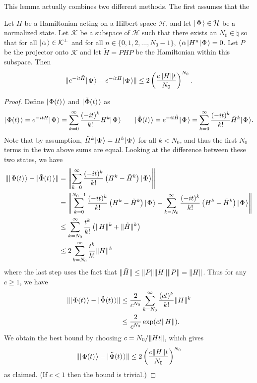 \documentclass[../thesis-main/thesis-main]{subfiles}
\begin{document}
This lemma actually combines two different methods.  The first assumes that the 


\begin{proposition}
\label{pro:trunc_prop}Let $H$ be a Hamiltonian acting on a Hilbert
space $\mathcal{H}$, and let $|\mspace{2mu} \Phi \mspace{2mu} \rangle\in\mathcal{H}$ be a normalized state. Let
$\mathcal{K}$ be a subspace of $\mathcal{H}$ such that there exists an $N_0\in\natural$
so that for all $|\mspace{2mu} \alpha \mspace{2mu} \rangle\in \mathcal{K}^{\perp}$ and for all $n\in\{0,1,2,\ldots, N_0-1\}$, $\langle\mspace{2mu} \alpha \mspace{2mu} |H^{n}|\mspace{2mu} \Phi \mspace{2mu} \rangle=0$.
Let $P$ be the projector onto $\mathcal{K}$ and let $\tilde{H}=PHP$ be
the Hamiltonian within this subspace.  Then
\[
\|{e^{-it\tilde{H}}|\mspace{2mu} \Phi \mspace{2mu} \rangle-e^{-itH}|\mspace{2mu} \Phi \mspace{2mu} \rangle}\| \leq 2\left(\frac{e\|{H}\|t}{N_0}\right)^{N_0}.
\]
\end{proposition}

\begin{proof}
Define $|\mspace{2mu} \Phi(t) \mspace{2mu} \rangle$ and $|\mspace{2mu} \tilde\Phi(t) \mspace{2mu} \rangle$
as
\[
|\mspace{2mu} \Phi(t) \mspace{2mu} \rangle=e^{-itH}|\mspace{2mu} \Phi \mspace{2mu} \rangle=\sum_{k=0}^{\infty}\frac{(-it)^{k}}{k!}H^{k}|\mspace{2mu} \Phi \mspace{2mu} \rangle\qquad|\mspace{2mu} \tilde\Phi(t) \mspace{2mu} \rangle=e^{-it\tilde{H}}|\mspace{2mu} \Phi \mspace{2mu} \rangle=\sum_{k=0}^{\infty}\frac{(-it)^{k}}{k!}\tilde{H}^{k}|\mspace{2mu} \Phi \mspace{2mu} \rangle.
\]
Note that by assumption, $\tilde{H}^{k}|\mspace{2mu} \Phi \mspace{2mu} \rangle=H^{k}|\mspace{2mu} \Phi \mspace{2mu} \rangle$ for all $k< N_0$, and thus the first $N_0$ terms in the two above sums are equal. Looking at the difference between these two states, we have
\begin{align*}
\|{|\mspace{2mu} \Phi(t) \mspace{2mu} \rangle-|\mspace{2mu} \tilde\Phi(t) \mspace{2mu} \rangle}\| & =\left\|{\sum_{k=0}^{\infty}\frac{(-it)^{k}}{k!}\left(H^{k}-\tilde{H}^{k}\right)|\mspace{2mu} \Phi \mspace{2mu} \rangle}\right\|\\
 & =\left\|{\sum_{k=0}^{N_0-1}\frac{(-it)^{k}}{k!}\left(H^{k}-\tilde{H}^{k}\right)|\mspace{2mu} \Phi \mspace{2mu} \rangle-\sum_{k=N_0}^{\infty}\frac{(-it)^{k}}{k!}\left(H^{k}-\tilde{H}^{k}\right)|\mspace{2mu} \Phi \mspace{2mu} \rangle}\right\|\\
 & \leq\sum_{k=N_0}^{\infty}\frac{t^{k}}{k!}\left(\|{H}\|^{k}+\|{\tilde{H}}\|^{k}\right) \\
 & \leq 2\sum_{k=N_0}^{\infty}\frac{t^{k}}{k!} \|{H}\|^{k}
\end{align*}
where the last step uses the fact that $\|{\tilde{H}}\|\leq\|{P}\|\|{H}\|\|{P}\| = \|{H}\|$.  Thus for any $c \ge 1$, we have
\begin{align*}
\|{|\mspace{2mu} \Phi(t) \mspace{2mu} \rangle-|\mspace{2mu} \tilde\Phi(t) \mspace{2mu} \rangle}\|
 & \leq\frac{2}{c^{N_0}}\sum_{k=N_0}^{\infty}\frac{(ct)^{k}}{k!}\|{H}\|^{k}\\
 & \leq\frac{2}{c^{N_0}}\exp(ct\|{H}\|).
\end{align*}
We obtain the best bound by choosing $c=N_0/\|{Ht}\|$, which gives
\[
  \|{|\mspace{2mu} \Phi(t) \mspace{2mu} \rangle-|\mspace{2mu} \tilde\Phi(t) \mspace{2mu} \rangle}\|
  \le 2\left(\frac{e\|{H}\|t}{N_0}\right)^{N_0}
\]
as claimed.  (If $c < 1$ then the bound is trivial.)
\end{proof}
\end{document}
